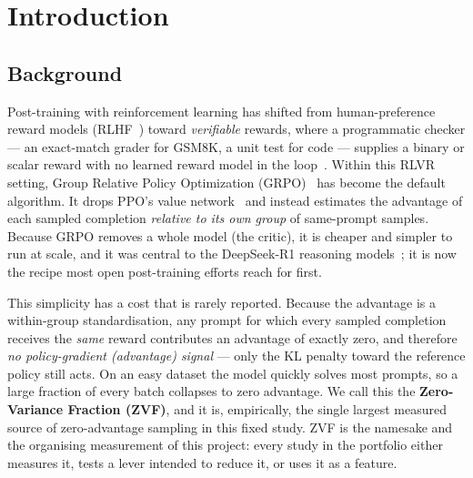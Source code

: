 \documentclass[12pt,a4paper]{report}
\begin{document}
\clearpage
\tableofcontents
\clearpage
\listoffigures
\clearpage
\listoftables

\clearpage
{}
\setcounter{page}{1}

\chapter{Introduction}
\label{ch:intro}

\section{Background}
Post-training with reinforcement learning has shifted from human-preference reward
models (RLHF~\cite{ouyang2022instructgpt}) toward \emph{verifiable} rewards, where
a programmatic checker --- an exact-match grader for GSM8K, a unit test for code
--- supplies a binary or scalar reward with no learned reward model in the
loop~\cite{lambert2024tulu3,guo2025r1}. Within this RLVR setting, Group Relative
Policy Optimization (GRPO)~\cite{shao2024deepseekmath} has become the default
algorithm. It drops PPO's value network~\cite{schulman2017ppo} and instead
estimates the advantage of each sampled completion \emph{relative to its own group}
of same-prompt samples. Because GRPO removes a whole model (the critic), it is
cheaper and simpler to run at scale, and it was central to the DeepSeek-R1
reasoning models~\cite{guo2025r1}; it is now the recipe most open post-training
efforts reach for first.

This simplicity has a cost that is rarely reported. Because the advantage is a
within-group standardisation, any prompt for which every sampled completion
receives the \emph{same} reward contributes an advantage of exactly zero, and
therefore \emph{no policy-gradient (advantage) signal} --- only the KL penalty
toward the reference policy still acts. On an easy dataset the model quickly solves most
prompts, so a large fraction of every batch collapses to zero advantage. We call
this the \textbf{Zero-Variance Fraction (ZVF)}, and it is, empirically, the single
largest measured source of zero-advantage sampling in this fixed study. ZVF is the namesake and the
organising measurement of this project: every study in the portfolio either
measures it, tests a lever intended to reduce it, or uses it as a feature.
\end{document}

